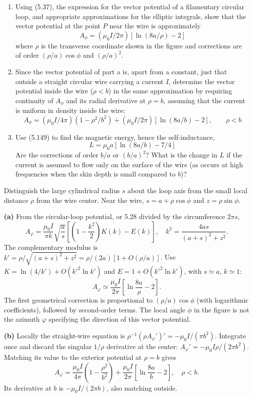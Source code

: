 \begin{enumerate}
\item[(a)] Using (5.37), the expression for the vector potential of a filamentary circular loop, and appropriate approximations for the elliptic integrals, show that the vector potential at the point $P$ near the wire is approximately
\[
A_{\phi}=(\mu_{0}I/2\pi)[\ln(8a/\rho)-2]
\]
where $\rho$ is the transverse coordinate shown in the figure and corrections are of order $(\rho/a)\cos\phi$ and $(\rho/a)^{2}$.
\item[(b)] Since the vector potential of part a is, apart from a constant, just that outside a straight circular wire carrying a current $I$, determine the vector potential inside the wire ($\rho<b$) in the same approximation by requiring continuity of $A_{\phi}$ and its radial derivative at $\rho=b$, assuming that the current is uniform in density inside the wire:
\[
A_{\phi}=(\mu_{0}I/4\pi)(1-\rho^{2}/b^{2})+(\mu_{0}I/2\pi)[\ln(8a/b)-2],\qquad\rho<b
\]
\item[(c)] Use (5.149) to find the magnetic energy, hence the self-inductance,
\[
L=\mu_{0}a[\ln(8a/b)-7/4]
\]
Are the corrections of order $b/a$ or $(b/a)^{2}$? What is the change in $L$ if the current is assumed to flow only on the surface of the wire (as occurs at high frequencies when the skin depth is small compared to $b$)?
\end{enumerate}
\solution
Distinguish the large cylindrical radius $s$ about the loop axis
from the small local distance $\rho$ from the wire center.
Near the wire, $s=a+\rho\cos\phi$ and $z=\rho\sin\phi$.

\textbf{(a)} From the circular-loop potential, or 5.28 divided by the
circumference $2\pi s$,
\[
A_\varphi=\frac{\mu_0I}{\pi k}\sqrt{\frac as}
\left[\left(1-\frac{k^2}{2}\right)K(k)-E(k)\right],
\quad
k^2=\frac{4as}{(a+s)^2+z^2}.
\]
The complementary modulus is
$k'=\rho/\sqrt{(a+s)^2+z^2}=\rho/(2a)[1+O(\rho/a)]$.
Use $K=\ln(4/k')+O(k'^2\ln k')$ and
$E=1+O(k'^2\ln k')$, with $s\simeq a$, $k\simeq1$:
\[
\boxed{A_\varphi\simeq\frac{\mu_0I}{2\pi}
\left[\ln\frac{8a}{\rho}-2\right].}
\]
The first geometrical correction is proportional to
$(\rho/a)\cos\phi$ (with logarithmic coefficients), followed by
second-order terms. The local angle $\phi$ in the figure is not the
azimuth $\varphi$ specifying the direction of this vector potential.

\textbf{(b)} Locally the straight-wire equation is
$\rho^{-1}(\rho A_\varphi')'=-\mu_0I/(\pi b^2)$.
Integrate once and discard the singular $1/\rho$ derivative at the center:
$A_\varphi'=-\mu_0I\rho/(2\pi b^2)$.
Matching its value to the exterior potential at $\rho=b$ gives
\[
\boxed{A_\varphi=\frac{\mu_0I}{4\pi}\left(1-\frac{\rho^2}{b^2}\right)
+\frac{\mu_0I}{2\pi}\left[\ln\frac{8a}{b}-2\right],\quad\rho<b.}
\]
Its derivative at $b$ is $-\mu_0I/(2\pi b)$, also matching outside.

